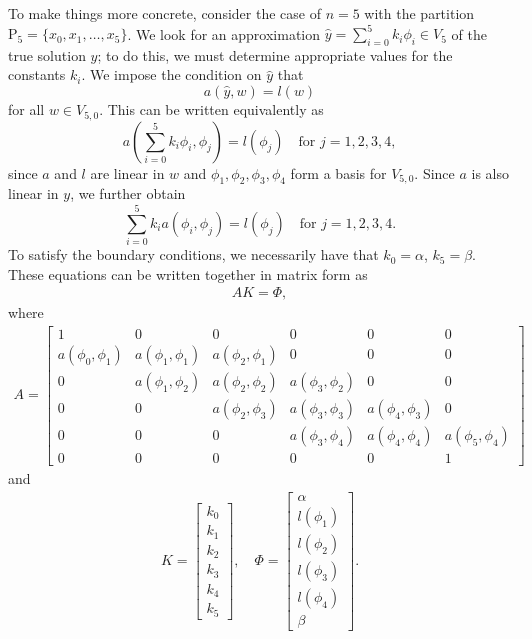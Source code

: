 To make things more concrete, consider the case of \(n=5\) with the partition $\mathrm{P}_5 = \{x_0, x_1, \ldots, x_5\}$.
We look for an approximation $\hat{y} = \sum_{i=0}^5 k_i \phi_i \in V_5$ of the true solution $y$; to do this, we must determine appropriate values for the constants $k_i$.
We impose the condition on $\hat{y}$ that
\[a(\hat{y},w) = l(w)\]
for all \(w \in V_{5,0}\).
This can be written equivalently as
\[a \left( \sum_{i=0}^5 k_i \phi_i,\phi_j \right) = l(\phi_j) \quad \text{for } j = 1,2,3,4,\]
since \(a\) and \(l\) are linear in \(w\) and $\phi_1, \phi_2, \phi_3, \phi_4$ form a basis for $V_{5,0}$.
Since $a$ is also linear in \(y\), we further obtain
\[\sum_{i=0}^5 k_i  a ( \phi_i,\phi_j ) = l(\phi_j) \quad \text{for } j = 1,2,3,4.\]
To satisfy the boundary conditions, we necessarily have that $k_0 = \alpha$, $k_5 = \beta$.
These equations can be written together in matrix form as
\begin{align} AK = \Phi,\label{eqn:FEM_linear_system}\end{align}
where
\begin{align}
A = \left[\begin{array}{cccccc}1 & 0 & 0 & 0 & 0 & 0 \\a(\phi_0,\phi_1) & a(\phi_1,\phi_1) & a(\phi_2,\phi_1) & 0 & 0 & 0 \\0 & a(\phi_1,\phi_2) & a(\phi_2,\phi_2) & a(\phi_3,\phi_2) & 0 & 0 \\0 & 0 & a(\phi_2,\phi_3) & a(\phi_3,\phi_3) & a(\phi_4,\phi_3) & 0 \\0 & 0 & 0 & a(\phi_3,\phi_4) & a(\phi_4,\phi_4) & a(\phi_5,\phi_4) \\0 & 0 & 0 & 0 & 0 &1\end{array}\right]
\label{eqn:FEM:A_matrix}
\end{align}
and
\begin{align}
K = \left[\begin{array}{c}k_0 \\k_1 \\k_2 \\k_3 \\k_4 \\k_5\end{array}\right] , \quad\Phi =  \left[\begin{array}{c}\alpha \\l(\phi_1) \\l(\phi_2) \\l(\phi_3) \\l(\phi_4) \\\beta\end{array}\right].
\label{eqn:FEM:K_Phi_definition}
\end{align}

